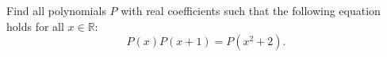 Find all polynomials $P$ with real coefficients such that the following equation holds for all $x \in \mathbb{R}$:
$$P(x)P(x+1) = P (x^2 + 2).$$